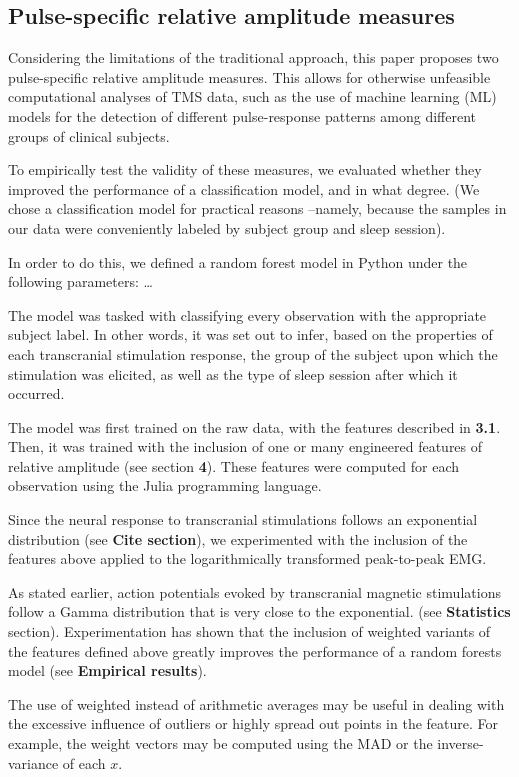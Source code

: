 \documentclass{article}
\begin{document}
\begin{multicols}{2}
\subsection{Pulse-specific relative amplitude measures}

Considering the limitations of the traditional approach, this paper proposes two
pulse-specific relative amplitude measures. This allows for otherwise unfeasible
computational analyses of TMS data, such as the use of machine learning (ML) models
for the detection of different pulse-response patterns among different groups of
clinical subjects.

To empirically test the validity of these measures, we evaluated whether they
improved the performance of a classification model, and in what degree. (We
chose a classification model for practical reasons --namely, because the
samples in our data were conveniently labeled by subject group and sleep
session). 

In order to do this, we defined a random forest model in Python under the
following parameters: \ldots

The model was tasked with classifying every observation with the appropriate subject
label. In other words, it was set out to infer, based on the properties of each
transcranial stimulation response, the group of the subject upon which the
stimulation was elicited, as well as the type of sleep session after which it
occurred.

The model was first trained on the raw data, with the features described in
\textbf{3.1}. Then, it was trained with the inclusion of one or many engineered
features of relative amplitude (see section \textbf{4}). These features were
computed for each observation using the Julia programming language.

Since the neural response to transcranial stimulations follows an exponential
distribution (see \textbf{Cite section}), we experimented with the inclusion of
the features above applied to the logarithmically transformed peak-to-peak EMG.

As stated earlier, action potentials evoked by transcranial magnetic
stimulations follow a Gamma distribution that is very close to the exponential.
(see \textbf{Statistics} section). Experimentation has shown that the inclusion
of weighted variants of the features defined above greatly improves the
performance of a random forests model (see \textbf{Empirical results}).

The use of weighted instead of arithmetic averages may be useful in dealing with
the excessive influence of outliers or highly spread out points in the feature.
For example, the weight vectors may be computed using the MAD or the
inverse-variance of each $x$. 


\end{multicols}
\end{document}
